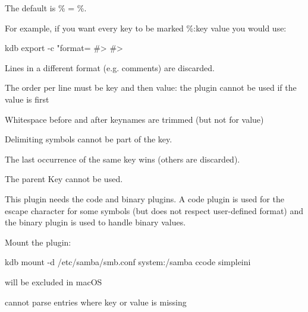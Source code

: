 The default is {\ttfamily \% = \%}.

For example, if you want every key to be marked {\ttfamily \%\+:key value} you would use\+:


\begin{DoxyCode}
kdb export -c "format=%
#> %
#> %
\end{DoxyCode}



\begin{DoxyItemize}
\item Lines in a different format (e.\+g. comments) are discarded.
\item The order per line must be key and then value\+: the plugin cannot be used if the value is first
\item Whitespace before and after keynames are trimmed (but not for value)
\item Delimiting symbols cannot be part of the key.
\item The last occurrence of the same key wins (others are discarded).
\item The parent Key cannot be used.
\item This plugin needs the code and binary plugins. A code plugin is used for the escape character for some symbols (but does not respect user-\/defined {\ttfamily format}) and the binary plugin is used to handle binary values.
\end{DoxyItemize}

Mount the plugin\+:


\begin{DoxyCode}
kdb mount -d /etc/samba/smb.conf system:/samba ccode simpleini
\end{DoxyCode}



\begin{DoxyItemize}
\item will be excluded in mac\+OS
\item cannot parse entries where key or value is missing 
\end{DoxyItemize}